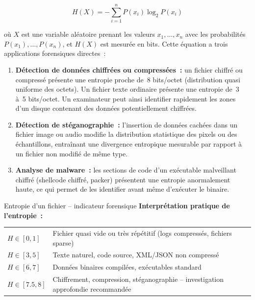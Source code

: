\begin{equation}
H(X) = -\sum_{i=1}^{n} P(x_i) \log_2 P(x_i)
\label{eq:shannon}
\end{equation}

où $X$ est une variable aléatoire prenant les valeurs $x_1, \ldots, x_n$
avec les probabilités $P(x_1), \ldots, P(x_n)$, et $H(X)$ est mesurée
en bits. Cette équation a trois applications forensiques directes~:

\begin{enumerate}
    \item \textbf{Détection de données chiffrées ou compressées~:}
          un fichier chiffré ou compressé présente une entropie proche de~8
          bits/octet (distribution quasi uniforme des octets). Un fichier texte
          ordinaire présente une entropie de~3 à~5 bits/octet. Un examinateur
          peut ainsi identifier rapidement les zones d'un disque contenant
          des données potentiellement chiffrées.

    \item \textbf{Détection de stéganographie~:} l'insertion de données cachées
          dans un fichier image ou audio modifie la distribution statistique
          des pixels ou des échantillons, entraînant une divergence entropique
          mesurable par rapport à un fichier non modifié de même type.

    \item \textbf{Analyse de malware~:} les sections de code d'un exécutable
          malveillant chiffré (shellcode chiffré, packer) présentent une
          entropie anormalement haute, ce qui permet de les identifier avant
          même d'exécuter le binaire.
\end{enumerate}

\begin{boxartefact}{Entropie d'un fichier -- indicateur forensique}
\textbf{Interprétation pratique de l'entropie~:}\\[0.5ex]
\begin{tabular}{p{3cm}p{7.5cm}}
$H \in [0, 1]$ & Fichier quasi vide ou très répétitif (logs compressés, fichiers
    sparse) \\
$H \in [3, 5]$ & Texte naturel, code source, XML/JSON non compressé \\
$H \in [6, 7]$ & Données binaires compilées, exécutables standard \\
$H \in [7.5, 8]$ & Chiffrement, compression, stéganographie -- investigation
    approfondie recommandée \\
\end{tabular}
\end{boxartefact}

